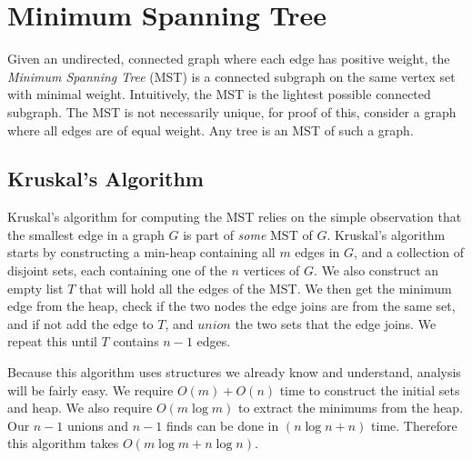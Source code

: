 \chapter{Minimum Spanning Tree}

Given an undirected, connected graph where each edge has positive
weight, the \emph{Minimum Spanning Tree} (MST) is a connected subgraph on the same 
vertex set with minimal weight. Intuitively, the MST is the lightest possible
connected subgraph. The MST is not necessarily unique, 
for proof of this, consider a graph where all edges are of equal weight. 
Any tree is an MST of such a graph. 

\section{Kruskal's Algorithm}


Kruskal's algorithm for computing the MST relies on the simple observation
that the smallest edge in a graph $G$ is part of \emph{some} MST of $G$.
Kruskal's algorithm starts by constructing a min-heap containing all $m$ edges
in $G$, and a collection of disjoint sets, each containing one of the
$n$ vertices of $G$. We also construct an empty list $T$ that will hold
all the edges of the MST. We then get the minimum edge from the heap, check if
the two nodes the edge joins are from the same set, and if not add 
the edge to $T$, and $union$ the two sets that the edge joins.
We repeat this until $T$ contains $n-1$ edges. 

Because this algorithm uses
structures we already know and understand, analysis will be fairly easy.
We require $O(m) + O(n)$ time to construct the initial sets and heap. We also
require $O(m \log m)$ to extract the minimums from the heap. Our $n-1$ unions
and $n-1$ finds can be done in $(n \log n + n)$ time. Therefore this algorithm
takes $O(m \log m + n \log n)$.

